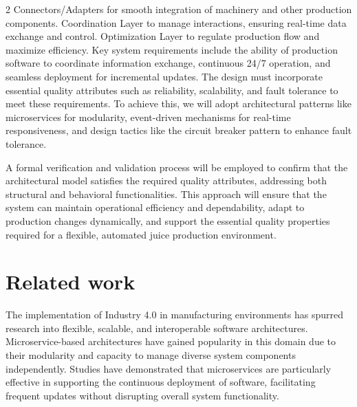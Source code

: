\documentclass{article}
\begin{document}
\begin{multicols}{2}
Connectors/Adapters for smooth integration of machinery and other production components.
Coordination Layer to manage interactions, ensuring real-time data exchange and control.
Optimization Layer to regulate production flow and maximize efficiency.
Key system requirements include the ability of production software to coordinate information exchange, continuous 24/7 operation, and seamless deployment for incremental updates. The design must incorporate essential quality attributes such as reliability, scalability, and fault tolerance to meet these requirements. To achieve this, we will adopt architectural patterns like microservices for modularity, event-driven mechanisms for real-time responsiveness, and design tactics like the circuit breaker pattern to enhance fault tolerance.

A formal verification and validation process will be employed to confirm that the architectural model satisfies the required quality attributes, addressing both structural and behavioral functionalities. This approach will ensure that the system can maintain operational efficiency and dependability, adapt to production changes dynamically, and support the essential quality properties required for a flexible, automated juice production environment.

\section{Related work}


\color{black}

The implementation of Industry 4.0 in manufacturing environments has spurred research into flexible, scalable, and interoperable software architectures. Microservice-based architectures have gained popularity in this domain due to their modularity and capacity to manage diverse system components independently. Studies have demonstrated that microservices are particularly effective in supporting the continuous deployment of software, facilitating frequent updates without disrupting overall system functionality. 


\end{multicols}
\end{document}
